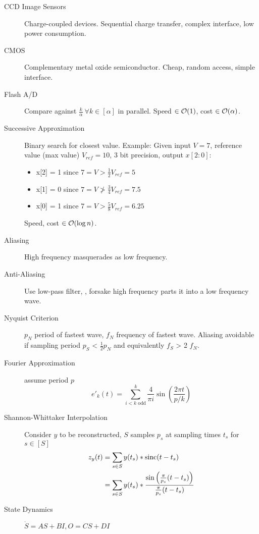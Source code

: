
\begin{description}
	\item[CCD Image Sensors] Charge-coupled devices. Sequential charge transfer,
	complex interface, low power consumption.
	\item[CMOS] Complementary metal oxide semiconductor. Cheap, random access,
	simple interface.
	\item[Flash A/D] Compare against $\frac{k}{\alpha} \ \forall k \in [\alpha]$
	in parallel. Speed $\in \operatorname{\mathcal{O}}(1)$, cost $\in \operatorname{\mathcal{O}}(\alpha)$.
	\item[Successive Approximation] Binary search for closest value. Example:
	Given input $V = 7$, reference value (max value) $V_{ref} = 10$, 3 bit
	precision,
	output $x[2:0]$:
	\begin{itemize}
		\item x[2] = 1 since $7 = V > \frac{1}{2} V_{ref} = 5$
		\item x[1] = 0 since $7 = V \ngtr \frac{3}{4} V_{ref} = 7.5$
		\item x[0] = 1 since $7 = V > \frac{5}{8} V_{ref} = 6.25$
	\end{itemize}
	Speed, cost $\in \operatorname{\mathcal{O}}(\log n)$.
	\item[Aliasing] High frequency masquerades as low frequency. 
	\item[Anti-Aliasing] Use low-pass filter, \ie, forsake high frequency parts
	 it into a low frequency wave.
	\item[Nyquist Criterion] $p_N$ period of fastest wave, $f_N$ frequency of
	fastest wave. Aliasing avoidable if sampling period $p_S$ < $\frac{1}{2} p_N$
	and equivalently $f_S$ > 2 $f_N$.
	\item[Fourier Approximation] assume period $p$
	\[ 
	e'_k(t) = \sum^{k}_{i < k \text{ odd}}\frac{4}{\pi i} \sin\left(\frac{2\pi t}
	{p/k}\right)
	\]
	\item[Shannon-Whittaker Interpolation] Consider $y$ to be reconstructed, $S$
	samples $p_s$ at sampling times $t_s$ for $s \in [S]$
	\begin{align*}
	z_y(t) 	&= \sum_{s \in S} y(t_s) * \operatorname{sinc}(t - t_s)\\
	 		&= \sum_{s \in S} y(t_s) * \frac{\sin\left(\frac{\pi}{p_s}(t-t_s)\right)}
	 		{\frac{\pi}{p_s}(t-t_s)}
	\end{align*}
	\item[State Dynamics] $\dot{S} = AS + BI, O = CS + DI$

\end{description}
